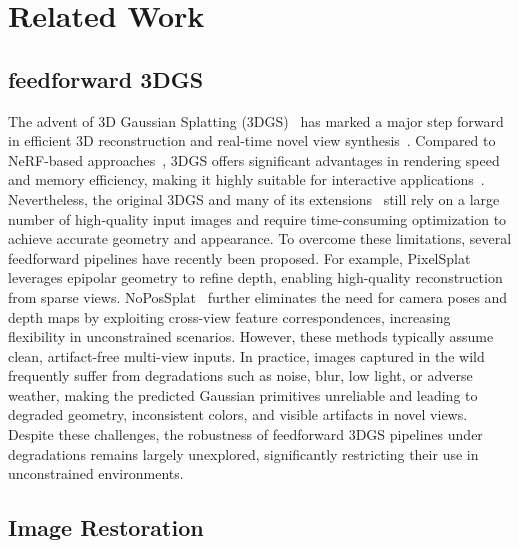 \documentclass[letterpaper]{article} %
\begin{document}
\section{Related Work}
\subsection{feedforward 3DGS}

The advent of 3D Gaussian Splatting (3DGS)~\cite{kerbl20233d} has marked a major step forward in efficient 3D reconstruction and real-time novel view synthesis~\cite{lyu20243dgsr,chen2024optimizing,yang2024deformable,lu20243d,chen2025trends}. Compared to NeRF-based approaches~\cite{barron2021mip,muller2022instant,gao2022nerf,chen2023bidirectional,huang2023refsr}, 3DGS offers significant advantages in rendering speed and memory efficiency, making it highly suitable for interactive applications~\cite{kim20243dgs,liu2025artgs,khalid2025gaussianvae,gao2025towards}. Nevertheless, the original 3DGS and many of its extensions~\cite{fei20243d, wu2024recent, dalal2024gaussian} still rely on a large number of high-quality input images and require time-consuming optimization to achieve accurate geometry and appearance. To overcome these limitations, several feedforward pipelines have recently been proposed. For example,  PixelSplat~\cite{charatan23pixelsplat} leverages epipolar geometry to refine depth, enabling high-quality reconstruction from sparse views. NoPosSplat~\cite{ye2024no} further eliminates the need for camera poses and depth maps by exploiting cross-view feature correspondences, increasing flexibility in unconstrained scenarios. However, these methods typically assume clean, artifact-free multi-view inputs. In practice, images captured in the wild frequently suffer from degradations such as noise, blur, low light, or adverse weather, making the predicted Gaussian primitives unreliable and leading to degraded geometry, inconsistent colors, and visible artifacts in novel views. Despite these challenges, the robustness of feedforward 3DGS pipelines under degradations remains largely unexplored, significantly restricting their use in unconstrained environments.




\subsection{Image Restoration}
\end{document}
